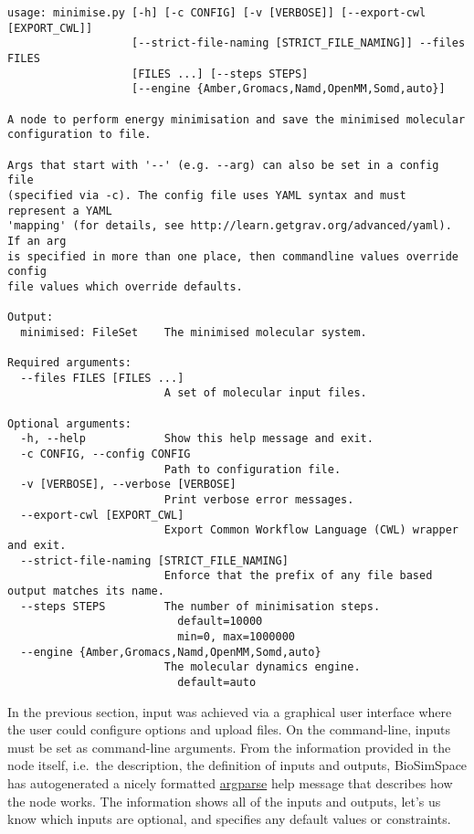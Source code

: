 \begin{verbatim}
usage: minimise.py [-h] [-c CONFIG] [-v [VERBOSE]] [--export-cwl [EXPORT_CWL]]
                   [--strict-file-naming [STRICT_FILE_NAMING]] --files FILES
                   [FILES ...] [--steps STEPS]
                   [--engine {Amber,Gromacs,Namd,OpenMM,Somd,auto}]

A node to perform energy minimisation and save the minimised molecular
configuration to file.

Args that start with '--' (e.g. --arg) can also be set in a config file
(specified via -c). The config file uses YAML syntax and must represent a YAML
'mapping' (for details, see http://learn.getgrav.org/advanced/yaml). If an arg
is specified in more than one place, then commandline values override config
file values which override defaults.

Output:
  minimised: FileSet    The minimised molecular system.

Required arguments:
  --files FILES [FILES ...]
                        A set of molecular input files.

Optional arguments:
  -h, --help            Show this help message and exit.
  -c CONFIG, --config CONFIG
                        Path to configuration file.
  -v [VERBOSE], --verbose [VERBOSE]
                        Print verbose error messages.
  --export-cwl [EXPORT_CWL]
                        Export Common Workflow Language (CWL) wrapper and exit.
  --strict-file-naming [STRICT_FILE_NAMING]
                        Enforce that the prefix of any file based output matches its name.
  --steps STEPS         The number of minimisation steps.
                          default=10000
                          min=0, max=1000000
  --engine {Amber,Gromacs,Namd,OpenMM,Somd,auto}
                        The molecular dynamics engine.
                          default=auto
\end{verbatim}

In the previous section, input was achieved via a graphical user
interface where the user could configure options and upload files. On
the command-line, inputs must be set as command-line arguments. From the
information provided in the node itself, i.e.~the description, the
definition of inputs and outputs, BioSimSpace has autogenerated a nicely
formatted
\href{https://docs.python.org/3/library/argparse.html}{argparse} help
message that describes how the node works. The information shows all of
the inputs and outputs, let's us know which inputs are optional, and
specifies any default values or constraints.

